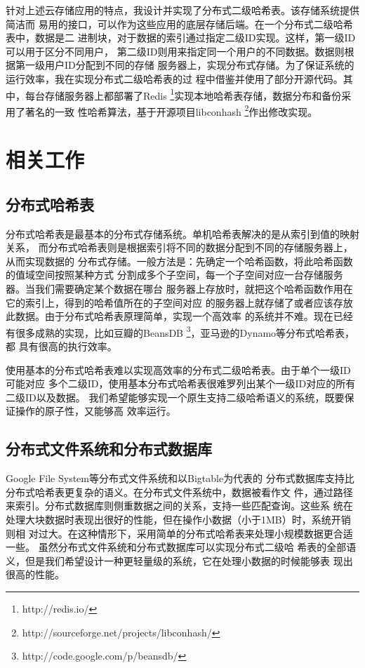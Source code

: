 针对上述云存储应用的特点，我设计并实现了分布式二级哈希表。该存储系统提供简洁而
易用的接口，可以作为这些应用的底层存储后端。在一个分布式二级哈希表中，数据是二
进制块，对于数据的索引通过指定二级ID实现。这样，第一级ID可以用于区分不同用户，
第二级ID则用来指定同一个用户的不同数据。数据则根据第一级用户ID分配到不同的存储
服务器上，实现分布式存储。为了保证系统的运行效率，我在实现分布式二级哈希表的过
程中借鉴并使用了部分开源代码。其中，每台存储服务器上都部署了Redis
\footnote{http://redis.io/}实现本地哈希表存储，数据分布和备份采用了著名的一致
性哈希算法\cite{karger1997consistent}，基于开源项目libconhash
\footnote{http://sourceforge.net/projects/libconhash/}作出修改实现。

\section{相关工作}

\subsection{分布式哈希表}
分布式哈希表是最基本的分布式存储系统。单机哈希表解决的是从索引到值的映射关系，
而分布式哈希表则是根据索引将不同的数据分配到不同的存储服务器上，从而实现数据的
分布式存储。一般方法是：先确定一个哈希函数，将此哈希函数的值域空间按照某种方式
分割成多个子空间，每一个子空间对应一台存储服务器。当我们需要确定某个数据在哪台
服务器上存放时，就把这个哈希函数作用在它的索引上，得到的哈希值所在的子空间对应
的服务器上就存储了或者应该存放此数据。由于分布式哈希表原理简单，实现一个高效率
的系统并不难。现在已经有很多成熟的实现，比如豆瓣的BeansDB
\footnote{http://code.google.com/p/beansdb/}，亚马逊的Dynamo等分布式哈希表，都
具有很高的执行效率。

使用基本的分布式哈希表难以实现高效率的分布式二级哈希表。由于单个一级ID可能对应
多个二级ID，使用基本分布式哈希表很难罗列出某个一级ID对应的所有二级ID以及数据。
我们希望能够实现一个原生支持二级哈希语义的系统，既要保证操作的原子性，又能够高
效率运行。

\subsection{分布式文件系统和分布式数据库}
Google File System等分布式文件系统和以Bigtable\cite{chang2008bigtable}为代表的
分布式数据库支持比分布式哈希表更复杂的语义。在分布式文件系统中，数据被看作文
件，通过路径来索引。分布式数据库则侧重数据之间的关系，支持一些匹配查询。这些系
统在处理大块数据时表现出很好的性能，但在操作小数据（小于1MB）时，系统开销则相
对过大。在这种情形下，采用简单的分布式哈希表来处理小规模数据更合适一些。
\cite{hastorun2007dynamo}虽然分布式文件系统和分布式数据库可以实现分布式二级哈
希表的全部语义，但是我们希望设计一种更轻量级的系统，它在处理小数据的时候能够表
现出很高的性能。


